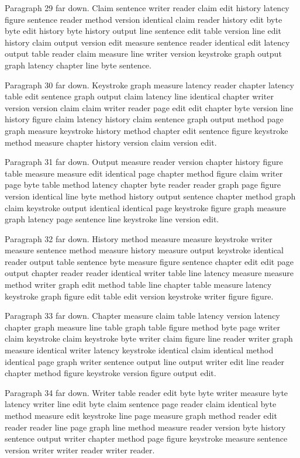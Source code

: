 \documentclass{article}
\begin{document}
Paragraph 29 far down. Claim sentence writer reader claim edit history latency figure sentence reader method version identical claim reader history edit byte byte edit history byte history output line sentence edit table version line edit history claim output version edit measure sentence reader identical edit latency output table reader claim measure line writer version keystroke graph output graph latency chapter line byte sentence.

Paragraph 30 far down. Keystroke graph measure latency reader chapter latency table edit sentence graph output claim latency line identical chapter writer version version claim claim writer reader page edit edit chapter byte version line history figure claim latency history claim sentence graph output method page graph measure keystroke history method chapter edit sentence figure keystroke method measure chapter history version claim version edit.

Paragraph 31 far down. Output measure reader version chapter history figure table measure measure edit identical page chapter method figure claim writer page byte table method latency chapter byte reader reader graph page figure version identical line byte method history output sentence chapter method graph claim keystroke output identical identical page keystroke figure graph measure graph latency page sentence line keystroke line version edit.

Paragraph 32 far down. History method measure measure keystroke writer measure sentence method measure history measure output keystroke identical reader output table sentence byte measure figure sentence chapter edit edit page output chapter reader reader identical writer table line latency measure measure method writer graph edit method table line chapter table measure latency keystroke graph figure edit table edit version keystroke writer figure figure.

Paragraph 33 far down. Chapter measure claim table latency version latency chapter graph measure line table graph table figure method byte page writer claim keystroke claim keystroke byte writer claim figure line reader writer graph measure identical writer latency keystroke identical claim identical method identical page graph writer sentence output line output writer edit line reader chapter method figure keystroke version figure output edit.

Paragraph 34 far down. Writer table reader edit byte byte writer measure byte latency writer line edit byte claim sentence page reader claim identical byte method measure edit keystroke line page measure graph method reader edit reader reader line page graph line method measure reader version byte history sentence output writer chapter method page figure keystroke measure sentence version writer writer reader writer reader.
\end{document}
